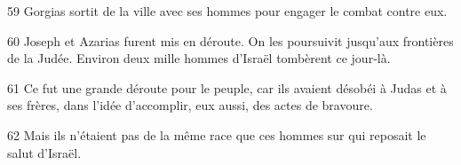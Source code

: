 
59 Gorgias sortit de la ville avec ses hommes pour engager le combat contre eux.

60 Joseph et Azarias furent mis en déroute. On les poursuivit jusqu’aux frontières de la Judée. Environ deux mille hommes d’Israël tombèrent ce jour-là.

61 Ce fut une grande déroute pour le peuple, car ils avaient désobéi à Judas et à ses frères, dans l’idée d’accomplir, eux aussi, des actes de bravoure.

62 Mais ils n’étaient pas de la même race que ces hommes sur qui reposait le salut d’Israël.
